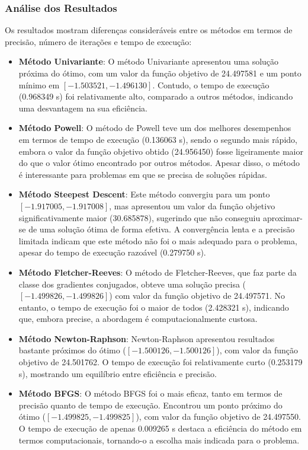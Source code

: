 \documentclass[a4paper, 12pt]{article}
\begin{document}
\subsubsection*{Análise dos Resultados}

Os resultados mostram diferenças consideráveis entre os métodos em termos de precisão, número de iterações e tempo de execução:

\begin{itemize}
    \item \textbf{Método Univariante}: O método Univariante apresentou uma solução próxima do ótimo, com um valor da função objetivo de 24.497581 e um ponto mínimo em \([-1.503521, -1.496130]\). Contudo, o tempo de execução (0.968349 s) foi relativamente alto, comparado a outros métodos, indicando uma desvantagem na sua eficiência.
    \item \textbf{Método Powell}: O método de Powell teve um dos melhores desempenhos em termos de tempo de execução (0.136063 s), sendo o segundo mais rápido, embora o valor da função objetivo obtido (24.956450) fosse ligeiramente maior do que o valor ótimo encontrado por outros métodos. Apesar disso, o método é interessante para problemas em que se precisa de soluções rápidas.
    \item \textbf{Método Steepest Descent}: Este método convergiu para um ponto \([-1.917005, -1.917008]\), mas apresentou um valor da função objetivo significativamente maior (30.685878), sugerindo que não conseguiu aproximar-se de uma solução ótima de forma efetiva. A convergência lenta e a precisão limitada indicam que este método não foi o mais adequado para o problema, apesar do tempo de execução razoável (0.279750 s).
    \item \textbf{Método Fletcher-Reeves}: O método de Fletcher-Reeves, que faz parte da classe dos gradientes conjugados, obteve uma solução precisa (\([-1.499826, -1.499826]\)) com valor da função objetivo de 24.497571. No entanto, o tempo de execução foi o maior de todos (2.428321 s), indicando que, embora precise, a abordagem é computacionalmente custosa.
    \item \textbf{Método Newton-Raphson}: Newton-Raphson apresentou resultados bastante próximos do ótimo (\([-1.500126, -1.500126]\)), com valor da função objetivo de 24.501762. O tempo de execução foi relativamente curto (0.253179 s), mostrando um equilíbrio entre eficiência e precisão.
    \item \textbf{Método BFGS}: O método BFGS foi o mais eficaz, tanto em termos de precisão quanto de tempo de execução. Encontrou um ponto próximo do ótimo (\([-1.499825, -1.499825]\)), com valor da função objetivo de 24.497550. O tempo de execução de apenas 0.009265 s destaca a eficiência do método em termos computacionais, tornando-o a escolha mais indicada para o problema.
\end{itemize}
\end{document}
